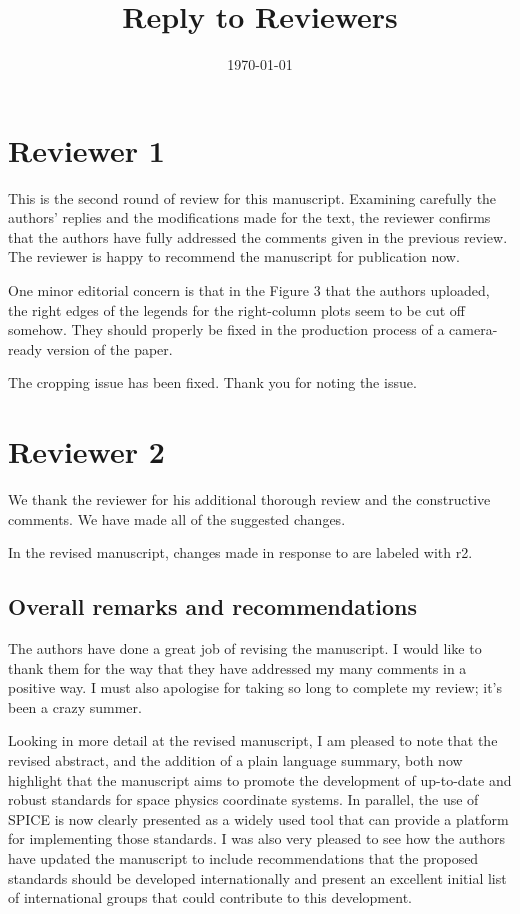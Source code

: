 \documentclass[11pt]{article}
\title{\vspace{-0.5in}Reply to Reviewers\vspace{-0.5in}}
\author{}
\date{\today}
\begin{document}
\maketitle

\section{Reviewer 1}

This is the second round of review for this manuscript. Examining carefully the authors' replies and the modifications made for the text, the reviewer confirms that the authors have fully addressed the comments given in the previous review. The reviewer is happy to recommend the manuscript for publication now.

One minor editorial concern is that in the Figure 3 that the authors uploaded, the right edges of the legends for the right-column plots seem to be cut off somehow. They should properly be fixed in the production process of a camera-ready version of the paper.
\\
{\color{violet}
\begin{leftbar}
The cropping issue has been fixed. Thank you for noting the issue.
\end{leftbar}
}

\section{Reviewer 2}

{\color{violet}
\begin{leftbar}
We thank the reviewer for his additional thorough review and the constructive comments. We have made all of the suggested changes.

In the revised manuscript, changes made in response to are labeled with r2.
\end{leftbar}
}

\subsection{Overall remarks and recommendations}

The authors have done a great job of revising the manuscript. I would like to thank them for the way that they have addressed my many comments in a positive way. I must also apologise for taking so long to complete my review; it’s been a crazy summer.

Looking in more detail at the revised manuscript, I am pleased to note that the revised abstract, and the addition of a plain language summary, both now highlight that the manuscript aims to promote the development of up-to-date and robust standards for space physics coordinate systems. In parallel, the use of SPICE is now clearly presented as a widely used tool that can provide a platform for implementing those
standards. I was also very pleased to see how the authors have updated the manuscript to include recommendations that the proposed standards should be developed internationally and present an excellent initial list of international groups that could contribute to this development.
\end{document}
